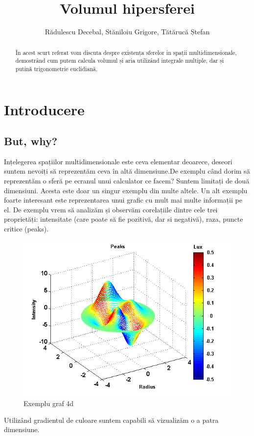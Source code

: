 \documentclass[12pt]{caltech_thesis}
\begin{document}
\title{Volumul hipersferei}
\author{Rădulescu Decebal, Stăniloiu Grigore, Tătărucă Ștefan}

\address{Timisoara, Romania}                     

\maketitle [logo]




\begin{abstract}
   În acest scurt referat vom discuta despre existența sferelor in spații multidimensionale, demostrând cum putem calcula volumul și aria utilizând integrale multiple, dar și putină trigonometrie euclidiană.
\end{abstract}


\tableofcontents
\printnomenclature

\mainmatter


\chapter{Introducere}
\section{But, why?}
Ințelegerea spațiilor multidimensionale este ceva elementar deoarece, deseori suntem nevoiți să reprezentăm ceva în altă dimensiune.De exemplu când dorim să reprezentăm o sferă pe ecranul unui calculator ce facem? Suntem limitați de două dimensiuni. Acesta este doar un singur exemplu din multe altele.
Un alt exemplu foarte interesant este reprezentarea unui grafic cu mult mai multe informații pe el. De exemplu vrem să analizăm și observăm corelațiile dintre cele trei proprietăți: intensitate (care poate să fie pozitivă, dar si negativă), raza, puncte critice (peaks).
\begin{figure}[hbt!]
\centering
\includegraphics[width=.3\textwidth]{graf4d.png}
\caption{Exemplu graf 4d}\label{fig:logo}
\end{figure}
Utilizând gradientul de culoare suntem capabili să vizualizăm o a patra dimensiune. 
\end{document}
